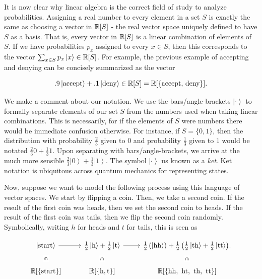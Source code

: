 \documentclass{article}
\theoremstyle{definition}
\numberwithin{figure}{section}
\begin{document}
It is now clear why linear algebra is the correct field of study to analyze probabilities. Assigning a real number to every element in a set $S$ is exactly the same as choosing a vector in $\mathbb{R}[S]$ - the real vector space uniquely defined to have $S$ as a basis. That is, every vector in $\mathbb{R}[S]$ is a linear combination of elements of $S$. If we have probabilities $p_x$ assigned to every $x\in S$, then this corresponds to the vector $\sum_{x\in S}p_x\left |x\right>\in \mathbb{R}[S]$. For example, the previous example of accepting and denying can be concisely summarized as the vector

$$.9\left|\text{accept}\right>+.1\left|\text{deny}\right>\in \mathbb{R}[S]=\mathbb{R}[\{\text{accept},\,\text{deny}\}].$$

We make a comment about our notation. We use the bars/angle-brackets $\left| \cdot \right>$ to formally separate elements of our set $S$ from the numbers used when taking linear combinations. This is necessarily, for if the elements of $S$ were numbers there would be immediate confusion otherwise. For instance, if $S=\{0,1\}$, then the distribution with probability $\frac{2}{3}$ given to $0$ and probability $\frac{1}{3}$ given to $1$ would be notated $\frac{2}{3}0+\frac{1}{3}1$. Upon separating with bars/angle-brackets, we arrive at the much more sensible $\frac{2}{3}\left|0\right>+\frac{1}{3}\left|1\right>$. The symbol $\left|\cdot \right>$ us known as a \textit{ket}. Ket notation is ubiquitous across quantum mechanics for representing states.

Now, suppose we want to model the following process using this language of vector spaces. We start by flipping a coin. Then, we take a second coin. If the result of the first coin was heads, then we set the second coin to heads. If the result of the first coin was tails, then we flip the second coin randomly. Symbolically, writing $h$ for heads and $t$ for tails, this is seen as

\[\begin{tikzcd}
	{\left|\text{start}\right>} & {\frac{1}{2}\left|\text{h}\right>+\frac{1}{2}\left|\text{t}\right>} & {\frac{1}{2}\left(\left|\text{hh}\right>\right)+\frac{1}{2}\left(\frac{1}{2}\left|\text{th}\right>+\frac{1}{2}\left|\text{tt}\right>\right)}. \\
	{\mathbb{R}[\{\text{start}\}]} & {\mathbb{R}[\{\text{h},\text{t}\}]} & {\mathbb{R}[\{\text{hh,\, ht,\, th,\, tt}\}]}
	\arrow[from=1-1, to=1-2]
	\arrow[from=1-2, to=1-3]
	\arrow["\vin"{description}, draw=none, from=1-1, to=2-1]
	\arrow["\vin"{description}, draw=none, from=1-2, to=2-2]
	\arrow["\vin"{description}, draw=none, from=1-3, to=2-3]
\end{tikzcd}\]
\end{document}
